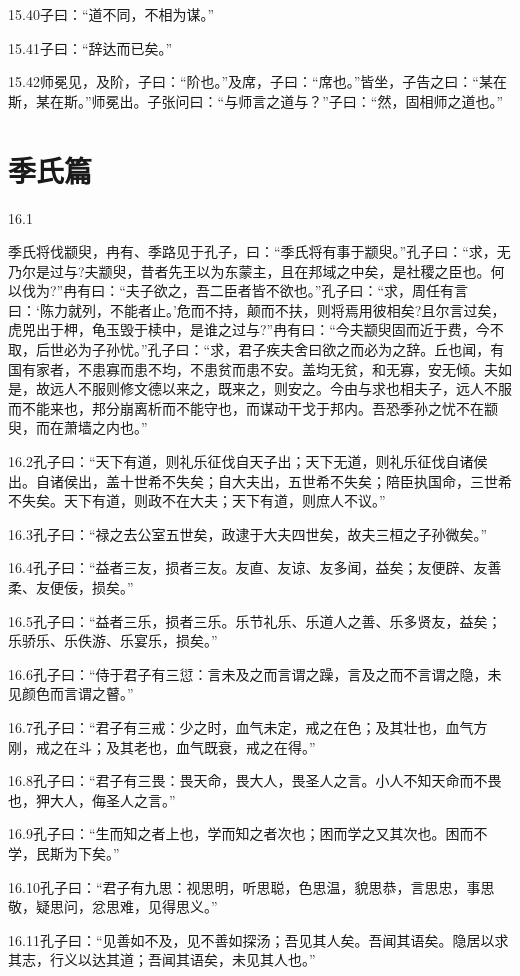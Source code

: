 \documentclass[a4paper,12pt,UTF8,twoside]{ctexbook}
\begin{document}
15.40子曰：“道不同，不相为谋。”

15.41子曰：“辞达而已矣。”

15.42师冕见，及阶，子曰：“阶也。”及席，子曰：“席也。”皆坐，子告之曰：“某在斯，某在斯。”师冕出。子张问曰：“与师言之道与？”子曰：“然，固相师之道也。”

\chapter{季氏篇}
16.1

季氏将伐颛臾，冉有、季路见于孔子，曰：“季氏将有事于颛臾。”孔子曰：“求，无乃尔是过与?夫颛臾，昔者先王以为东蒙主，且在邦域之中矣，是社稷之臣也。何以伐为?”冉有曰：“夫子欲之，吾二臣者皆不欲也。”孔子曰：“求，周任有言曰：‘陈力就列，不能者止。’危而不持，颠而不扶，则将焉用彼相矣?且尔言过矣，虎兕出于柙，龟玉毁于椟中，是谁之过与?”冉有曰：“今夫颛臾固而近于费，今不取，后世必为子孙忧。”孔子曰：“求，君子疾夫舍曰欲之而必为之辞。丘也闻，有国有家者，不患寡而患不均，不患贫而患不安。盖均无贫，和无寡，安无倾。夫如是，故远人不服则修文德以来之，既来之，则安之。今由与求也相夫子，远人不服而不能来也，邦分崩离析而不能守也，而谋动干戈于邦内。吾恐季孙之忧不在颛臾，而在萧墙之内也。”

16.2孔子曰：“天下有道，则礼乐征伐自天子出；天下无道，则礼乐征伐自诸侯出。自诸侯出，盖十世希不失矣；自大夫出，五世希不失矣；陪臣执国命，三世希不失矣。天下有道，则政不在大夫；天下有道，则庶人不议。”

16.3孔子曰：“禄之去公室五世矣，政逮于大夫四世矣，故夫三桓之子孙微矣。”

16.4孔子曰：“益者三友，损者三友。友直、友谅、友多闻，益矣；友便辟、友善柔、友便佞，损矣。”

16.5孔子曰：“益者三乐，损者三乐。乐节礼乐、乐道人之善、乐多贤友，益矣；乐骄乐、乐佚游、乐宴乐，损矣。”

16.6孔子曰：“侍于君子有三愆：言未及之而言谓之躁，言及之而不言谓之隐，未见颜色而言谓之瞽。”

16.7孔子曰：“君子有三戒：少之时，血气未定，戒之在色；及其壮也，血气方刚，戒之在斗；及其老也，血气既衰，戒之在得。”

16.8孔子曰：“君子有三畏：畏天命，畏大人，畏圣人之言。小人不知天命而不畏也，狎大人，侮圣人之言。”

16.9孔子曰：“生而知之者上也，学而知之者次也；困而学之又其次也。困而不学，民斯为下矣。”

16.10孔子曰：“君子有九思：视思明，听思聪，色思温，貌思恭，言思忠，事思敬，疑思问，忿思难，见得思义。”

16.11孔子曰：“见善如不及，见不善如探汤；吾见其人矣。吾闻其语矣。隐居以求其志，行义以达其道；吾闻其语矣，未见其人也。”
\end{document}
